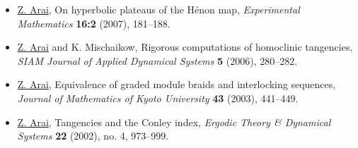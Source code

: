 \documentclass[11pt]{jsarticle}
\begin{document}
\begin{itemize}
\smallskip

\item[{\sf [16]}]
{\underline{Z. Arai}}, 
{On hyperbolic plateaus of the H\'{e}non map},
{\it Experimental Mathematics}
{\bf 16:2} (2007), 181--188.

\smallskip

\item[{\sf [17]}] 
{\underline{Z. Arai}} and K. Mischaikow, 
{Rigorous computations of homoclinic tangencies},
{\it SIAM Journal of Applied Dynamical Systems}
{\bf 5} (2006), 280--282.

 \smallskip

\item[{\sf [18]}]
{\underline{Z. Arai}}, 
{Equivalence of graded module braids and interlocking sequences},
{\it Journal of Mathematics of Kyoto University} 
{\bf 43} (2003), 441--449. 

 \smallskip

\item[{\sf [19]}] 
{\underline{Z. Arai}},
{Tangencies and the Conley index},
{\it Ergodic Theory \& Dynamical Systems} 
{\bf 22} (2002), no. 4, 973--999.

\end{itemize}
\end{document}
